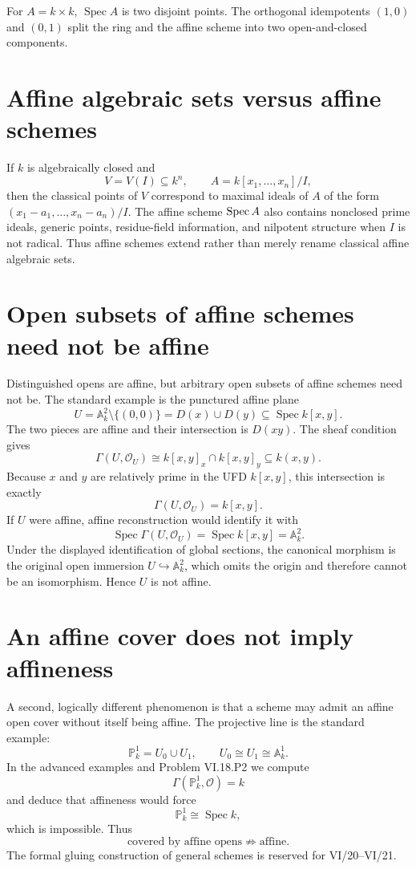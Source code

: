 \begin{example}\label{ex:vi18-expand-03}
For $A=k\times k$, $\operatorname{Spec}A$ is two disjoint points.  The orthogonal idempotents $(1,0)$ and $(0,1)$ split the ring and the affine scheme into two open-and-closed components.
\end{example}
\section{Affine algebraic sets versus affine schemes}

If $k$ is algebraically closed and
\[
V=V(I)\subseteq k^n,
\qquad
A=k[x_1,\dots,x_n]/I,
\]
then the classical points of $V$ correspond to maximal ideals of $A$ of the form
$(x_1-a_1,\dots,x_n-a_n)/I$.  The affine scheme $\operatorname{Spec} A$ also contains nonclosed prime
ideals, generic points, residue-field information, and nilpotent structure when $I$ is not
radical.  Thus affine schemes extend rather than merely rename classical affine algebraic
sets.

\section{Open subsets of affine schemes need not be affine}
Distinguished opens are affine, but arbitrary open subsets of affine schemes need not be.  The standard example is the punctured affine plane
\[
U=\mathbb A_k^2\setminus\{(0,0)\}=D(x)\cup D(y)\subseteq\operatorname{Spec}k[x,y].
\]
The two pieces are affine and their intersection is $D(xy)$.  The sheaf condition gives
\[
\Gamma(U,\mathcal O_U)
\cong k[x,y]_x\cap k[x,y]_y
\subseteq k(x,y).
\]
Because $x$ and $y$ are relatively prime in the UFD $k[x,y]$, this intersection is exactly
\[
\boxed{\Gamma(U,\mathcal O_U)=k[x,y].}
\]
If $U$ were affine, affine reconstruction would identify it with
\[
\operatorname{Spec}\Gamma(U,\mathcal O_U)=\operatorname{Spec}k[x,y]=\mathbb A_k^2.
\]
Under the displayed identification of global sections, the canonical morphism is the original open immersion $U\hookrightarrow\mathbb A_k^2$, which omits the origin and therefore cannot be an isomorphism.  Hence $U$ is not affine.



\section{An affine cover does not imply affineness}
A second, logically different phenomenon is that a scheme may admit an affine open cover without itself being affine.  The projective line is the standard example:
\[
\mathbb P^1_k=U_0\cup U_1,
\qquad U_0\cong U_1\cong\mathbb A^1_k.
\]
In the advanced examples and Problem VI.18.P2 we compute
\[
\Gamma(\mathbb P^1_k,\mathcal O)=k
\]
and deduce that affineness would force
\[
\mathbb P^1_k\cong\operatorname{Spec}k,
\]
which is impossible.  Thus
\[
\boxed{\text{covered by affine opens}\not\Rightarrow\text{affine}.}
\]
The formal gluing construction of general schemes is reserved for VI/20--VI/21.


